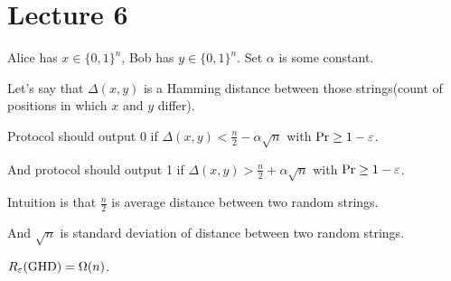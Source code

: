\section{Lecture 6}

\begin{problem} \label{problem:GHD}
	Alice has $x \in \{0, 1\}^n$, Bob has $y \in \{0, 1\}^n$.
	Set $\alpha$ is some constant.
	
	Let's say that $\Delta(x, y)$ is a Hamming distance between those strings(count of positions in which $x$ and $y$ differ).
	
	Protocol should output 0 if $\Delta(x, y) < \frac n 2 - \alpha \sqrt n$ with $\Pr \geq 1 - \varepsilon$.
	
	And protocol should output 1 if $\Delta(x, y) > \frac n 2 + \alpha \sqrt n$ with $\Pr \geq 1 - \varepsilon$.
\end{problem}

\begin{remrk}
	Intuition is that $\frac n 2$ is average distance between two random strings.
	
	And $\sqrt n$ is standard deviation of distance between two random strings.
\end{remrk}

\begin{thm}
	$R_\varepsilon(\text{GHD}) = \Omega(n)$.
\end{thm}

